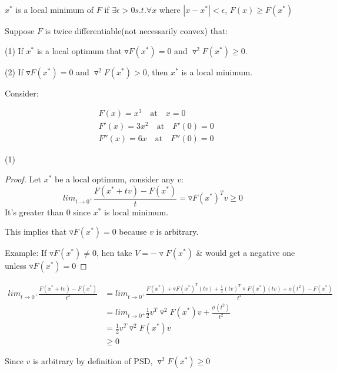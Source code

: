 \begin{definition}
	$x^*$ is a local minimum of $F$ if $\exists \epsilon >0 s.t. \forall x$ where $|x - x^*| < \epsilon$, $F(x) \geq F(x^*)$
\end{definition}

\begin{theorem}
	Suppose $F$ is twice differentiable(not necessarily convex) that:
	
	(1) If $x^*$ is a local optimum that $\triangledown F(x^*) = 0$ and $\triangledown^2F(x^*)\geq 0$.
	
	(2) If $\triangledown F(x^*) = 0$ and $\triangledown^2F(x^*)> 0$, then $x^*$ is a local minimum. 
\end{theorem}


Consider:

\begin{align*}
&F(x) = x^3 \quad \text{at} \quad x = 0\\
&F'(x) = 3x^2 \quad \text{at} \quad F'(0) = 0\\
&F''(x) = 6x \quad \text{at} \quad F''(0) = 0
\end{align*}

(1) 
\begin{proof}
	Let $x^*$ be a local optimum, consider any $v$:
	\begin{equation*}
	lim_{t\rightarrow 0^+}\frac{F(x^* + tv) - F(x^*)}{t} = \triangledown F(x^*)^Tv\geq 0
	\end{equation*}
	It's greater than 0 since $x^*$ is local minimum.
	
	This implies that $\triangledown F(x^*) = 0$ because $v$ is arbitrary. 
	
	Example: If $\triangledown F(x^*) \neq 0$, hen take $V = -\triangledown F(x^*)$ \& would get a negative one unless $\triangledown F(x^*) = 0$
	
\end{proof}

\begin{align*}
lim_{t\rightarrow 0^+}\frac{F(x^* + tv) - F(x^*)}{t^2} &= lim_{t\rightarrow 0^+} \frac{F(x^*) + \triangledown F(x^*)^T(tv) + \frac{1}{2}(tv)^T\triangledown F(x^*)(tv) + o(t^2) - F(x^*)}{t^2}\\
&= lim_{t\rightarrow 0^+} \frac{1}{2}v^T\triangledown^2F(x^*)v+\frac{\sigma(t^2)}{t^2}\\
&= \frac{1}{2}v^T\triangledown^2F(x^*)v \\
&\geq 0
\end{align*}

Since $v$ is arbitrary by definition of PSD, $\triangledown^2 F(x^*) \geq 0$

